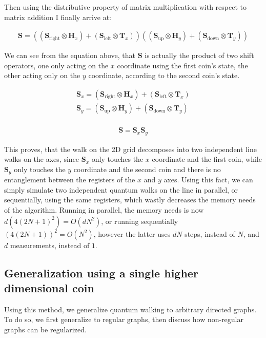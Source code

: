 Then using the distributive property of matrix multiplication with respect to matrix addition I finally arrive at:

\begin{align*} 
    \mathbf{S} =   
    ((\mathbf{S}_{\text{right}} \otimes \mathbf{H}_x) + (\mathbf{S}_{\text{left}} \otimes \mathbf{T}_x))
    ((\mathbf{S}_{\text{up}} \otimes \mathbf{H}_y) + (\mathbf{S}_{\text{down}} \otimes \mathbf{T}_y))
\end{align*}

We can see from the equation above, that $\mathbf{S}$ is actually the product of two shift operators, one only
acting on the $x$ coordinate using the first coin's state, the other acting only on the $y$ coordinate, according to the second
coin's state.

\begin{align*} 
    \mathbf{S}_x = (\mathbf{S}_{\text{right}} \otimes \mathbf{H}_x) + (\mathbf{S}_{\text{left}} \otimes \mathbf{T}_x) \\
    \mathbf{S}_y = (\mathbf{S}_{\text{up}} \otimes \mathbf{H}_y) + (\mathbf{S}_{\text{down}} \otimes \mathbf{T}_y) \\
\end{align*}    

\begin{align*}
    \mathbf{S} = \mathbf{S}_x\mathbf{S}_y
\end{align*}

This proves, that the walk on the 2D grid decomposes into two independent line walks on the axes, since $\mathbf{S}_x$ only touches the $x$ coordinate and the first coin, while $\mathbf{S}_y$ only touches the $y$ coordinate and the second coin and there is no entanglement between the registers of the $x$ and $y$ axes. Using this fact, we can simply simulate two independent quantum walks on the line in parallel, or sequentially, using the same registers, which wastly decreases the memory needs of the algorithm. Running in parallel, the memory needs is now $d(4(2N+1)^2) = O(dN^2)$, or running sequentially $(4(2N+1))^2 = O(N^2)$, however the latter uses $dN$ steps, instead of $N$, and $d$ measurements, instead of $1$.

\subsection{Generalization using a single higher dimensional coin}

Using this method, we generalize quantum walking to arbitrary directed graphs. To do so, we first generalize to regular graphs, then discuss how non-regular graphs can be regularized.

